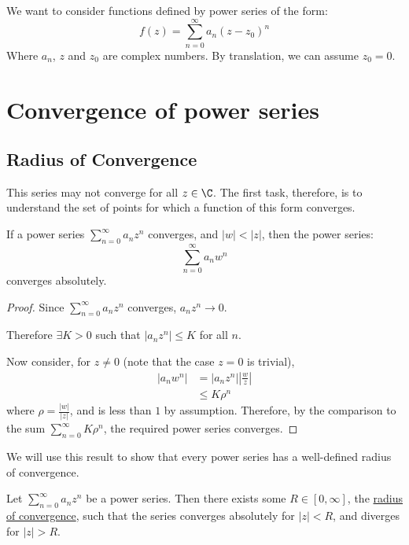 \documentclass[../Main.tex]{subfiles}
\begin{document}
We want to consider functions defined by power series of the form:
\begin{equation}
    f(z) = \sum_{n=0}^\infty a_n (z - z_0)^n
\end{equation}
Where $a_n$, $z$ and $z_0$ are complex numbers. By translation, we can assume $z_0 = 0$.
\section{Convergence of power series}
\subsection{Radius of Convergence}
This series may not converge for all $z \in \C$. The first task, therefore, is to understand the set of points for which a function of this form converges.
\begin{lemma}
    If a power series $\sum_{n=0}^\infty a_n z^n$ converges, and $|w| < |z|$, then the power series:
    \begin{equation*}
        \sum_{n=0}^\infty a_n w^n
    \end{equation*}
    converges absolutely.
    \label{lemConvergenceRegionIsDisc}
\end{lemma}
\begin{proof}
    Since $\sum_{n=0}^\infty a_n z^n$ converges, $a_n z^n \to 0$.\par
    Therefore $\exists K > 0$ such that $|a_n z^n| \leq K$ for all $n$.\par
    Now consider, for $z \neq 0$ (note that the case $z = 0$ is trivial),
    \begin{align*}
        |a_n w^n| &= |a_n z^n| \left|\frac{w}{z}\right| \\
        &\leq K\rho^n
    \end{align*}
    where $\rho = \frac{|w|}{|z|}$, and is less than $1$ by assumption. Therefore, by the comparison to the sum $\sum_{n=0}^\infty K\rho^n$, the required power series converges.
\end{proof}
\begin{remark}
    We will use this result to show that every power series has a well-defined radius of convergence.
\end{remark}
\begin{theorem}
    Let $\sum_{n=0}^\infty a_n z^n$ be a power series. Then there exists some $R \in [0, \infty]$, the \underline{radius of convergence}, such that the series converges absolutely for $|z| < R$, and diverges for $|z| > R$.
    \label{thmRadiusOfConvergence}
\end{theorem}
\end{document}
